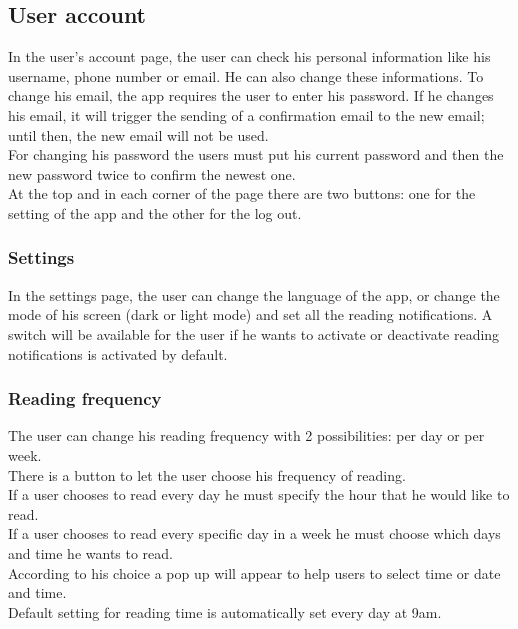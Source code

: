 \documentclass[conference]{IEEEtran}
\begin{document}
\subsection{User account}

In the user’s account page, the user can check his personal information like his username, phone number or email. He can also change these informations. To change his email, the app requires the user to enter his password. If he changes his email, it will trigger the sending of a confirmation email to the new email; until then, the new email will not be used.\\
For changing his password the users must put his current password and then the new password twice to confirm the newest one.\\
At the top and in each corner of the page there are two buttons: one for the setting of the app and the other for the log out.\\

\subsubsection{Settings}\hfill

In the settings page, the user can change the language of the app, or change the mode of his screen (dark or light mode) and set all the reading notifications. A switch will be available for the user if he wants to activate or deactivate reading notifications is activated by default.\\

\subsubsection{Reading frequency}\hfill

The user can change his reading frequency with 2 possibilities: per day or per week.\\
There is a button to let the user choose his frequency of reading.\\
If a user chooses to read every day he must specify the hour that he would like to read.\\
If a user chooses to read every specific day in a week he must choose which days and time he wants to read.\\
According to his choice a pop up will appear to help users to select time or date and time.\\
Default setting for reading time is automatically set every day at 9am.\\
\end{document}
